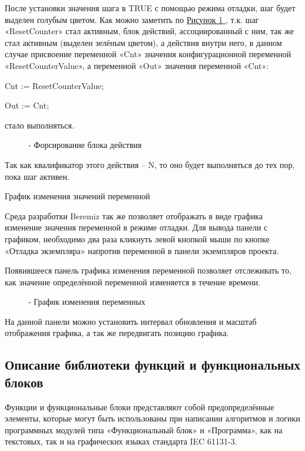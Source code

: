 \documentclass[letterpaper,10pt,russian]{sphinxmanual}
\begin{document}
После установки значения шага в TRUE с помощью режима отладки, шаг будет
выделен голубым цветом. Как можно заметить по \hyperref[usage_guide/work_with_project:image227]{Рисунок \ref{usage_guide/work_with_project:image227} }, т.к. шаг
«ResetCounter» стал активным, блок действий, ассоциированный с ним, так
же стал активным (выделен зелёным цветом), а действия внутри него, в
данном случае присвоение переменной «Cnt» значения конфигурационной
переменной «ResetCounterValue», а переменной «Out» значения переменной
«Cnt»:

Cnt := ResetCounterValue;

Out := Cnt;

стало выполняться.
\begin{figure}[htbp]
\centering
\capstart

\noindent{}
\caption{- Форсирование блока действия}\label{usage_guide/work_with_project:image227}\end{figure}

Так как квалификатор этого действия – N, то оно будет выполняться до тех
пор, пока шаг активен.

График изменения значений переменной

Среда разработки Beremiz так же позволяет отображать в виде графика
изменение значения переменной в режиме отладки. Для вывода панели с
графиком, необходимо два раза кликнуть левой кнопкой мыши по кнопке
«Отладка экземпляра» напротив переменной в панели экземпляров проекта.

Появившееся панель графика изменения переменной позволяет
отслеживать то, как значение определённой переменной изменяется в
течение времени.
\begin{figure}[htbp]
\centering
\capstart

\noindent{}
\caption{- График изменения переменных}\label{usage_guide/work_with_project:image228}\end{figure}

На данной панели можно установить интервал обновления и масштаб
отображения графика, а так же передвигать позицию графика.


\subsection{Описание библиотеки функций и функциональных блоков}
\label{usage_guide/library::doc}\label{usage_guide/library:id1}
Функции и функциональные блоки представляют собой предопределённые
элементы, которые могут быть использованы при написании алгоритмов и
логики программных модулей типа «Функциональный блок» и «Программа», как
на текстовых, так и на графических языках стандарта IEC 61131-3.
\end{document}
